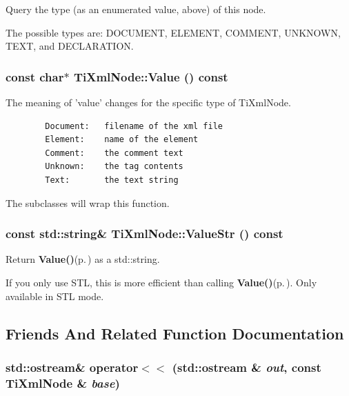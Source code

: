 Query the type (as an enumerated value, above) of this node. 

The possible types are: DOCUMENT, ELEMENT, COMMENT, UNKNOWN, TEXT, and DECLARATION.
\subsubsection{\setlength{\rightskip}{0pt plus 5cm}const char$\ast$ Ti\-Xml\-Node::Value () const\hspace{0.3cm}{\tt  [inline, inherited]}}\label{classTiXmlNode_TiXmlUnknowna7}


The meaning of 'value' changes for the specific type of Ti\-Xml\-Node. 



\footnotesize\begin{verbatim}
		Document:	filename of the xml file
		Element:	name of the element
		Comment:	the comment text
		Unknown:	the tag contents
		Text:		the text string
		\end{verbatim}
\normalsize


The subclasses will wrap this function.
\subsubsection{\setlength{\rightskip}{0pt plus 5cm}const std::string\& Ti\-Xml\-Node::Value\-Str () const\hspace{0.3cm}{\tt  [inline, inherited]}}\label{classTiXmlNode_TiXmlUnknowna8}


Return {\bf Value()}{\rm (p.\,\pageref{classTiXmlNode_TiXmlUnknowna7})} as a std::string. 

If you only use STL, this is more efficient than calling {\bf Value()}{\rm (p.\,\pageref{classTiXmlNode_TiXmlUnknowna7})}. Only available in STL mode.

\subsection{Friends And Related Function Documentation}
\subsubsection{\setlength{\rightskip}{0pt plus 5cm}std::ostream\& operator$<$$<$ (std::ostream \& {\em out}, const {\bf Ti\-Xml\-Node} \& {\em base})\hspace{0.3cm}{\tt  [friend, inherited]}}\label{classTiXmlNode_TiXmlUnknownn1}


